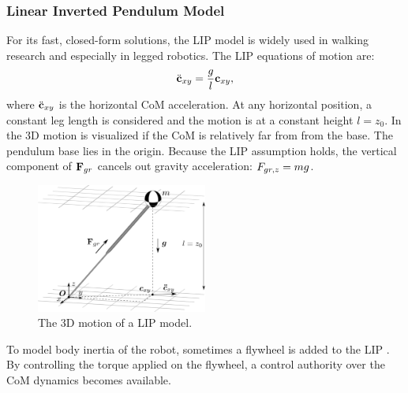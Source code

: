 \subsubsection{Linear Inverted Pendulum Model} 
For its fast, closed-form solutions, the \ac{LIP} model \cite{kajita20013d} is widely used in walking research and especially in legged robotics. The \ac{LIP} equations of motion are:
\begin{equation}
\ddot{\mathbf{c}}_{xy}=\frac{g}{l}\mathbf{c}_{xy},
\label{eq:LIPeom}
\end{equation}
where $\ddot{\mathbf{c}}_{xy}$ is the horizontal \ac{CoM} acceleration. At any horizontal position, a constant leg length is considered and the motion is at a constant height $l=z_0$. In  the \ac{3D} motion is visualized if the \ac{CoM} is relatively far from from the base. The pendulum base lies in the origin. Because the \ac{LIP} assumption holds, the vertical component of $\mathbf{F}_{gr}$ cancels out gravity acceleration: $F_{gr,z}=mg$.\\
\begin{figure}
\centering
\includegraphics[width=0.5\textwidth]{STYLESTUFF/3DCoMwithoutfoot.png}
\caption{The \ac{3D} motion of a \ac{LIP} model.}
\label{fig:3dlip}
\end{figure}

To model body inertia of the robot, sometimes a flywheel is added to the \ac{LIP} \cite{pratt2006capture, stephens2007humanoid, koolen2012capturability}. By controlling the torque applied on the flywheel, a control authority  over the \ac{CoM} dynamics becomes available. 

